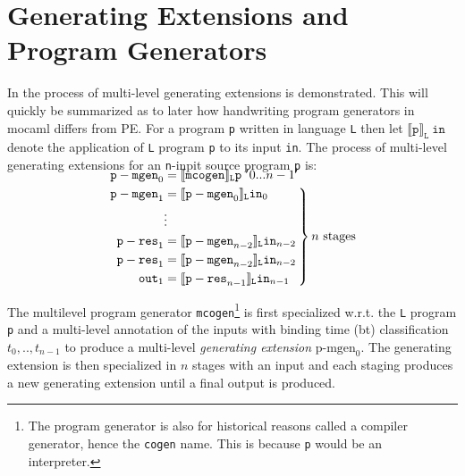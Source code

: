 
\section{Generating Extensions and Program Generators}

In \cite{multilevel} the process of multi-level generating extensions is demonstrated. This will quickly be summarized as to later how handwriting program generators in mocaml differs from PE. For a program \texttt{p} written in language \texttt{L} then let $\llbracket \mathtt{p}\rrbracket_\mathtt{L}~\mathtt{in}$ denote the application of \texttt{L} program \texttt{p} to its input \texttt{in}. The process of multi-level generating extensions for an \texttt{n}-inpit
source program \texttt{p} is:

\begin{align*}
  \left. 
  \begin{aligned}
    \noalign{\vspace{-\baselineskip}}
    \mathtt{p-mgen}_0 &= \llbracket \mathtt{mcogen}\rrbracket_\mathtt{L} \mathtt{p} ~ '0...n-1'\\  
    \mathtt{p-mgen}_1 &= \llbracket \mathtt{p-mgen}_0\rrbracket_\mathtt{L} \mathtt{in}_0\\
                      &\vdots\\
    \mathtt{p-res}_1 &= \llbracket \mathtt{p-mgen}_{n-2}\rrbracket_\mathtt{L} \mathtt{in}_{n-2}\\
    \mathtt{p-res}_1 &= \llbracket \mathtt{p-mgen}_{n-2}\rrbracket_\mathtt{L} \mathtt{in}_{n-2}\\
    \mathtt{out}_1 &= \llbracket \mathtt{p-res}_{n-1}\rrbracket_\mathtt{L} \mathtt{in}_{n-1}
  \end{aligned}
  \right\}n~\text{stages}                     
\end{align*}

The multilevel program generator \texttt{mcogen}\footnote{The program generator is also for historical reasons called a compiler generator, hence the \texttt{cogen} name. This is because \texttt{p} would be an interpreter.} is first specialized w.r.t. the \texttt{L} program \texttt{p} and a multi-level annotation of the inputs with binding time (bt) classification $t_0,..,t_{n-1}$ to produce a multi-level \textit{generating extension} $\text{p-mgen}_0$. The generating extension is then specialized in $n$ stages with an input and each staging produces a new generating extension until a final output is produced.

